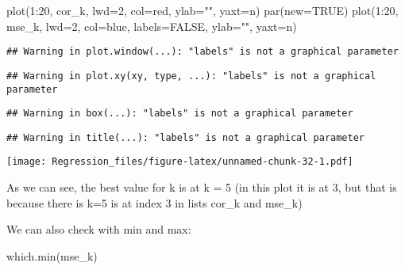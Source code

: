 \documentclass[
]{article}
\newenvironment{Shaded}{\begin{snugshade}}{\end{snugshade}}
\newcommand{\AttributeTok}[1]{\textcolor[rgb]{0.77,0.63,0.00}{#1}}
\newcommand{\ConstantTok}[1]{\textcolor[rgb]{0.00,0.00,0.00}{#1}}
\newcommand{\DecValTok}[1]{\textcolor[rgb]{0.00,0.00,0.81}{#1}}
\newcommand{\FunctionTok}[1]{\textcolor[rgb]{0.00,0.00,0.00}{#1}}
\newcommand{\NormalTok}[1]{#1}
\newcommand{\SpecialCharTok}[1]{\textcolor[rgb]{0.00,0.00,0.00}{#1}}
\newcommand{\StringTok}[1]{\textcolor[rgb]{0.31,0.60,0.02}{#1}}
\begin{document}
\begin{Shaded}
\begin{Highlighting}[]
\FunctionTok{plot}\NormalTok{(}\DecValTok{1}\SpecialCharTok{:}\DecValTok{20}\NormalTok{, cor\_k, }\AttributeTok{lwd=}\DecValTok{2}\NormalTok{, }\AttributeTok{col=}\StringTok{\textquotesingle{}red\textquotesingle{}}\NormalTok{, }\AttributeTok{ylab=}\StringTok{""}\NormalTok{, }\AttributeTok{yaxt=}\StringTok{\textquotesingle{}n\textquotesingle{}}\NormalTok{)}
\FunctionTok{par}\NormalTok{(}\AttributeTok{new=}\ConstantTok{TRUE}\NormalTok{)}
\FunctionTok{plot}\NormalTok{(}\DecValTok{1}\SpecialCharTok{:}\DecValTok{20}\NormalTok{, mse\_k, }\AttributeTok{lwd=}\DecValTok{2}\NormalTok{, }\AttributeTok{col=}\StringTok{\textquotesingle{}blue\textquotesingle{}}\NormalTok{, }\AttributeTok{labels=}\ConstantTok{FALSE}\NormalTok{, }\AttributeTok{ylab=}\StringTok{""}\NormalTok{, }\AttributeTok{yaxt=}\StringTok{\textquotesingle{}n\textquotesingle{}}\NormalTok{)}
\end{Highlighting}
\end{Shaded}

\begin{verbatim}
## Warning in plot.window(...): "labels" is not a graphical parameter
\end{verbatim}

\begin{verbatim}
## Warning in plot.xy(xy, type, ...): "labels" is not a graphical parameter
\end{verbatim}

\begin{verbatim}
## Warning in box(...): "labels" is not a graphical parameter
\end{verbatim}

\begin{verbatim}
## Warning in title(...): "labels" is not a graphical parameter
\end{verbatim}

\texttt{[image: Regression\_files/figure-latex/unnamed-chunk-32-1.pdf]}

As we can see, the best value for k is at k = 5 (in this plot it is at
3, but that is because there is k=5 is at index 3 in lists cor\_k and
mse\_k)

We can also check with min and max:

\begin{Shaded}
\begin{Highlighting}[]
\FunctionTok{which.min}\NormalTok{(mse\_k)}
\end{Highlighting}
\end{Shaded}
\end{document}
